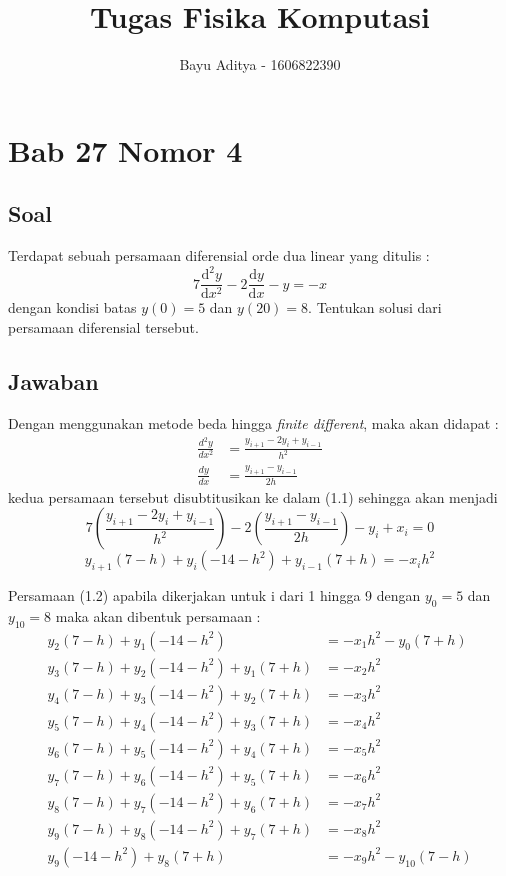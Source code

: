 \documentclass[a4paper,12pt]{article}
\title{Tugas Fisika Komputasi}
\author{Bayu Aditya - 1606822390}
\numberwithin{equation}{section} %
\begin{document}
\maketitle
\section{Bab 27 Nomor 4}
\subsection{Soal}
Terdapat sebuah persamaan diferensial orde dua linear yang ditulis :
\begin{equation}
 7\frac{\mathrm{d}^2 y}{\mathrm{d} x^2} - 2\frac{\mathrm{d} y}{\mathrm{d} x} - y = -x
\end{equation}
dengan kondisi batas $y(0) = 5$ dan $y(20) = 8$. Tentukan solusi dari persamaan diferensial tersebut.
\subsection{Jawaban}
Dengan menggunakan metode beda hingga \textit{finite different}, maka akan didapat :
\begin{align*}
\frac{d^2y}{dx^2} &= \frac{y_{i+1}-2y_i+y_{i-1}}{h^2}\\ 
\frac{dy}{dx} &= \frac{y_{i+1}-y_{i-1}}{2h}
\end{align*}
kedua persamaan tersebut disubtitusikan ke dalam (1.1) sehingga akan menjadi
$$7\left(\frac{y_{i+1}-2y_i+y_{i-1}}{h^2} \right ) -2\left(\frac{y_{i+1}-y_{i-1}}{2h} \right ) - y_i + x_i = 0$$
\begin{equation}
y_{i+1}(7-h) + y_i(-14-h^2) + y_{i-1}(7+h) = -x_ih^2 
\end{equation}

Persamaan (1.2) apabila dikerjakan untuk i dari 1 hingga 9 dengan $y_0 = 5$ dan $y_{10}=8$ maka akan dibentuk persamaan :
\begin{align*}
y_2(7-h) + y_1(-14-h^2)&= -x_1h^2 - y_0(7+h)	\tag{i=1}\\ 
y_3(7-h) + y_2(-14-h^2) + y_1(7+h) &= -x_2h^2	\tag{i=2}\\ 
y_4(7-h) + y_3(-14-h^2) + y_2(7+h) &= -x_3h^2	\tag{i=3}\\ 
y_5(7-h) + y_4(-14-h^2) + y_3(7+h) &= -x_4h^2	\tag{i=4}\\ 
y_6(7-h) + y_5(-14-h^2) + y_4(7+h) &= -x_5h^2	\tag{i=5}\\ 
y_7(7-h) + y_6(-14-h^2) + y_5(7+h) &= -x_6h^2	\tag{i=6}\\ 
y_8(7-h) + y_7(-14-h^2) + y_6(7+h) &= -x_7h^2	\tag{i=7}\\ 
y_9(7-h) + y_8(-14-h^2) + y_7(7+h) &= -x_8h^2	\tag{i=8}\\ 
y_9(-14-h^2) + y_8(7+h) &= -x_9h^2 - y_{10}(7-h)	\tag{i=9}
\end{align*}
\end{document}
